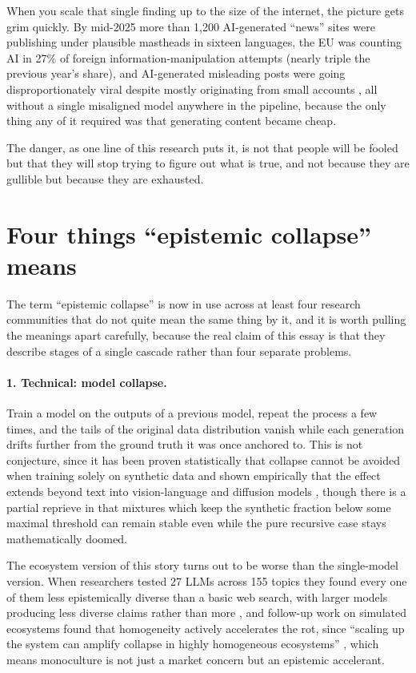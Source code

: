 \documentclass[11pt,letterpaper]{article}
\begin{document}
When you scale that single finding up to the size of the internet, the picture gets grim quickly. By mid-2025 more than 1{,}200 AI-generated ``news'' sites were publishing under plausible mastheads in sixteen languages, the EU was counting AI in 27\% of foreign information-manipulation attempts (nearly triple the previous year's share), and AI-generated misleading posts were going disproportionately viral despite mostly originating from small accounts \citep{characterizing}, all without a single misaligned model anywhere in the pipeline, because the only thing any of it required was that generating content became cheap.

The danger, as one line of this research puts it, is not that people will be fooled but that they will stop trying to figure out what is true, and not because they are gullible but because they are exhausted.

\section{Four things ``epistemic collapse'' means}

The term ``epistemic collapse'' is now in use across at least four research communities that do not quite mean the same thing by it, and it is worth pulling the meanings apart carefully, because the real claim of this essay is that they describe stages of a single cascade rather than four separate problems.

\paragraph{1. Technical: model collapse.}
Train a model on the outputs of a previous model, repeat the process a few times, and the tails of the original data distribution vanish while each generation drifts further from the ground truth it was once anchored to. This is not conjecture, since it has been proven statistically that collapse cannot be avoided when training solely on synthetic data \citep{statistical} and shown empirically that the effect extends beyond text into vision-language and diffusion models \citep{multimodal}, though there is a partial reprieve in that mixtures which keep the synthetic fraction below some maximal threshold can remain stable even while the pure recursive case stays mathematically doomed.

The ecosystem version of this story turns out to be worse than the single-model version. When researchers tested 27 LLMs across 155 topics they found every one of them less epistemically diverse than a basic web search, with larger models producing less diverse claims rather than more \citep{diversity}, and follow-up work on simulated ecosystems found that homogeneity actively accelerates the rot, since ``scaling up the system can amplify collapse in highly homogeneous ecosystems'' \citep{diversity-mitigates}, which means monoculture is not just a market concern but an epistemic accelerant.
\end{document}
